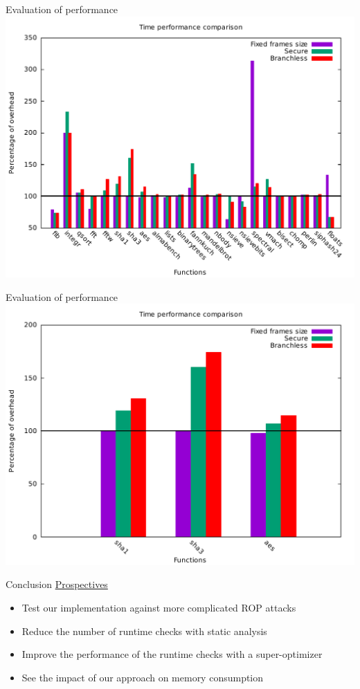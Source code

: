 \documentclass{beamer}
\begin{document}
\begin{frame}[c]{Evaluation of performance }
	\includegraphics[width=\textwidth]{images/time_percentage_graph.pdf}
\end{frame}

\begin{frame}[c]{Evaluation of performance }
	\includegraphics[width=\textwidth]{images/percentage_focus.pdf}
\end{frame}


\begin{frame}[c]{Conclusion}
	\underline{Prospectives}
	\begin{itemize}
		\item Test our implementation against more complicated ROP attacks
		\item Reduce the number of runtime checks with static analysis

		\item Improve the performance of the runtime checks with a super-optimizer
		\item See the impact of our approach on memory consumption
	\end{itemize}
\end{frame}

 
\end{document}
